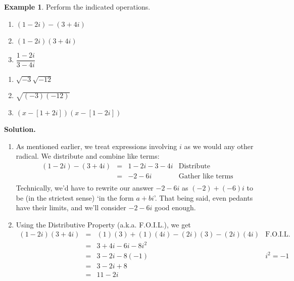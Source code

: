 \documentclass[11pt]{article}
\theoremstyle{definition}  %
\newtheorem{ex}{\bf Example}
\newcounter{HW}
\begin{document}
\begin{ex} \label{complexzeroex1} Perform the indicated operations.
\label{complexnumberarithmetic}

\begin{multicols}{3}
\begin{enumerate}

\item  $(1-2i) - (3+4i)$ 
\item  $(1-2i)(3+4i)$ 
\item  $\dfrac{1-2i}{3-4i}$

\setcounter{HW}{\value{enumi}}
\end{enumerate}
\end{multicols}

\begin{multicols}{3}
\begin{enumerate}
\setcounter{enumi}{\value{HW}}

\item  $\sqrt{-3} \sqrt{-12}$
\item  $\sqrt{(-3)(-12)}$
\item  $(x-[1+2i])(x-[1-2i])$

\setcounter{HW}{\value{enumi}}
\end{enumerate}
\end{multicols}

{\bf Solution.} 

\begin{enumerate}

\item  As mentioned earlier, we treat expressions involving $i$ as we would any other radical. We distribute and combine like terms:\[ \begin{array}{rclr}

 (1-2i) - (3+4i) & = &  1-2i-3-4i & \text{Distribute} \\
                 & = &  -2 - 6i & \text{Gather like terms} \\
\end{array}\] Technically, we'd have to rewrite our answer  $-2-6i$ as $(-2) + (-6)i$ to be (in the strictest sense) `in the form $a+bi$'. That being said, even pedants have their limits, and we'll consider $-2-6i$ good enough.

\item  Using the Distributive Property (a.k.a. F.O.I.L.), we get \[ \begin{array}{rclr}

  (1-2i)(3+4i)  & = & (1)(3) + (1)(4i) - (2i)(3) - (2i)(4i) & \text{F.O.I.L.} \\
	              & = & 3+4i-6i-8i^2 & \\
								& = & 3 - 2i - 8(-1) & \text{$i^2=-1$} \\
								& = & 3 - 2i + 8 & \\
								& = & 11 - 2i & \\ \end{array}\]


\end{enumerate}
\end{ex}
\end{document}

